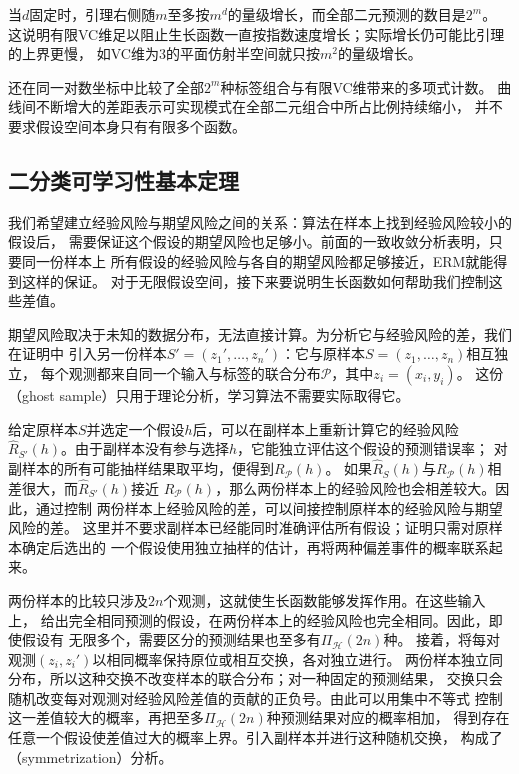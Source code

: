 当$d$固定时，引理右侧随$m$至多按$m^d$的量级增长，而全部二元预测的数目是$2^m$。
这说明有限VC维足以阻止生长函数一直按指数速度增长；实际增长仍可能比引理的上界更慢，
如VC维为3的平面仿射半空间就只按$m^2$的量级增长。

还在同一对数坐标中比较了全部$2^m$种标签组合与有限VC维带来的多项式计数。
曲线间不断增大的差距表示可实现模式在全部二元组合中所占比例持续缩小，
并不要求假设空间本身只有有限多个函数。

\subsection{二分类可学习性基本定理}
\label{sec:binary-learnability-characterization}

我们希望建立经验风险与期望风险之间的关系：算法在样本上找到经验风险较小的假设后，
需要保证这个假设的期望风险也足够小。前面的一致收敛分析表明，只要同一份样本上
所有假设的经验风险与各自的期望风险都足够接近，ERM就能得到这样的保证。
对于无限假设空间，接下来要说明生长函数如何帮助我们控制这些差值。

期望风险取决于未知的数据分布，无法直接计算。为分析它与经验风险的差，我们在证明中
引入另一份样本$S'=(z_1',\ldots,z_n')$：它与原样本$S=(z_1,\ldots,z_n)$相互独立，
每个观测都来自同一个输入与标签的联合分布$\mathcal P$，其中$z_i=(x_i,y_i)$。
这份（ghost sample）只用于理论分析，学习算法不需要实际取得它。

给定原样本$S$并选定一个假设$h$后，可以在副样本上重新计算它的经验风险
$\hat R_{S'}(h)$。由于副样本没有参与选择$h$，它能独立评估这个假设的预测错误率；
对副样本的所有可能抽样结果取平均，便得到$R_{\mathcal P}(h)$。
如果$\hat R_S(h)$与$R_{\mathcal P}(h)$相差很大，而$\hat R_{S'}(h)$接近
$R_{\mathcal P}(h)$，那么两份样本上的经验风险也会相差较大。因此，通过控制
两份样本上经验风险的差，可以间接控制原样本的经验风险与期望风险的差。
这里并不要求副样本已经能同时准确评估所有假设；证明只需对原样本确定后选出的
一个假设使用独立抽样的估计，再将两种偏差事件的概率联系起来。

两份样本的比较只涉及$2n$个观测，这就使生长函数能够发挥作用。在这些输入上，
给出完全相同预测的假设，在两份样本上的经验风险也完全相同。因此，即使假设有
无限多个，需要区分的预测结果也至多有$\Pi_{\mathcal H}(2n)$种。
接着，将每对观测$(z_i,z_i')$以相同概率保持原位或相互交换，各对独立进行。
两份样本独立同分布，所以这种交换不改变样本的联合分布；对一种固定的预测结果，
交换只会随机改变每对观测对经验风险差值的贡献的正负号。由此可以用集中不等式
控制这一差值较大的概率，再把至多$\Pi_{\mathcal H}(2n)$种预测结果对应的概率相加，
得到存在任意一个假设使差值过大的概率上界。引入副样本并进行这种随机交换，
构成了（symmetrization）分析。

